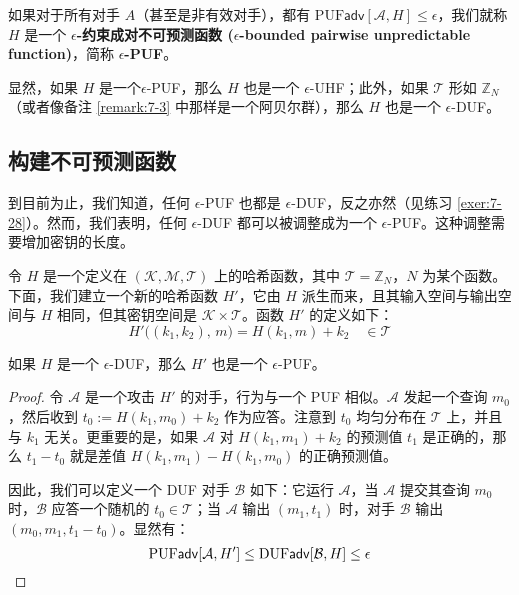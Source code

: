 \begin{definition}\label{def:7-7}
如果对于所有对手 $A$（甚至是非有效对手），都有 $\mathrm{PUF}\mathsf{adv}[\mathcal{A},H]\leq\epsilon$，我们就称 $H$ 是一个 \textbf{$\epsilon$-约束成对不可预测函数 ($\epsilon$-bounded pairwise unpredictable function)}，简称 \textbf{$\epsilon$-PUF}。
\end{definition}

显然，如果 $H$ 是一个$\epsilon$-PUF，那么 $H$ 也是一个 $\epsilon$-UHF；此外，如果 $\mathcal{T}$ 形如 $\mathbb{Z}_N$（或者像备注 \ref{remark:7-3} 中那样是一个阿贝尔群），那么 $H$ 也是一个 $\epsilon$-DUF。

\subsection{构建不可预测函数}\label{subsec:7-6-2}

到目前为止，我们知道，任何 $\epsilon$-PUF 也都是 $\epsilon$-DUF，反之亦然（见练习 \ref{exer:7-28}）。然而，我们表明，任何 $\epsilon$-DUF 都可以被调整成为一个 $\epsilon$-PUF。这种调整需要增加密钥的长度。

令 $H$ 是一个定义在 $(\mathcal{K},\mathcal{M},\mathcal{T})$ 上的哈希函数，其中 $\mathcal{T}=\mathbb{Z}_N$，$N$ 为某个函数。下面，我们建立一个新的哈希函数 $H'$，它由 $H$ 派生而来，且其输入空间与输出空间与 $H$ 相同，但其密钥空间是 $\mathcal{K}\times\mathcal{T}$。函数 $H'$ 的定义如下：
\begin{equation}\label{eq:7-32}
H'\big((k_1,k_2),\,m\big)=H(k_1,m)+k_2\quad\in\mathcal{T}
\end{equation}

\begin{lemma}\label{lemma:7-11}
如果 $H$ 是一个 $\epsilon$-DUF，那么 $H'$ 也是一个 $\epsilon$-PUF。
\end{lemma}

\begin{proof}
令 $\mathcal{A}$ 是一个攻击 $H'$ 的对手，行为与一个 PUF 相似。$\mathcal{A}$ 发起一个查询 $m_0$，然后收到 $t_0:=H(k_1,m_0)+k_2$ 作为应答。注意到 $t_0$ 均匀分布在 $\mathcal{T}$ 上，并且与 $k_1$ 无关。更重要的是，如果 $\mathcal{A}$ 对 $H(k_1,m_1)+k_2$ 的预测值 $t_1$ 是正确的，那么 $t_1-t_0$ 就是差值 $H(k_1,m_1)-H(k_1,m_0)$ 的正确预测值。

因此，我们可以定义一个 DUF 对手 $\mathcal{B}$ 如下：它运行 $\mathcal{A}$，当 $\mathcal{A}$ 提交其查询 $m_0$ 时，$\mathcal{B}$ 应答一个随机的 $t_0\in\mathcal{T}$；当 $\mathcal{A}$ 输出 $(m_1,t_1)$ 时，对手 $\mathcal{B}$ 输出 $(m_0,m_1,t_1-t_0)$。显然有：
\[
\mathrm{PUF}\mathsf{adv}[\mathcal{A},H']\leq\mathrm{DUF}\mathsf{adv}[\mathcal{B},H]\leq\epsilon\qedhere
\]
\end{proof}

